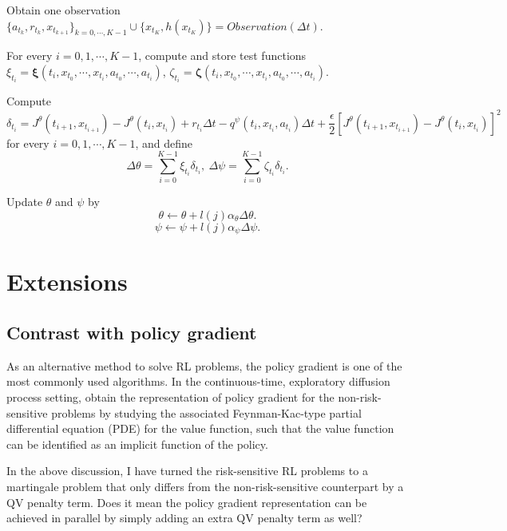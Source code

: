 \begin{algorithm}[htbp]
\begin{algorithmic}
{{				Obtain one observation $\{a_{t_k}, r_{t_{k}}, x_{t_{k+1}}\}_{k = 0,\cdots, K-1}\cup \{ x_{t_K}, h(x_{t_K})\} = \textit{Observation}(\Delta t)$.
				
			}
			
			
			For every $i = 0,1,\cdots,K-1$, compute and store test functions $\xi_{t_i} = \bm{\xi}(t_i, x_{t_0},\cdots, x_{t_i},a_{t_0},\cdots, a_{t_i})$, $\zeta_{t_i} = \bm{\zeta}(t_i, x_{t_0},\cdots, x_{t_i},a_{t_0},\cdots, a_{t_i})$.	
			
			Compute
			\[ \delta_{t_i} = J^{\theta}(t_{i+1},x_{t_{i+1}}) - J^{\theta}(t_{i},x_{t_{i}}) + r_{t_i}\Delta t -q^{\psi}(t_{i},x_{t_{i}},a_{t_i})\Delta t + \frac{\epsilon}{2}\left[ J^{\theta}(t_{i+1},x_{t_{i+1}}) - J^{\theta}(t_{i},x_{t_{i}})   \right]^2  \]
			for every $i = 0,1,\cdots,K-1$, and define
			\[ \Delta \theta = \sum_{i=0}^{K-1} \xi_{t_i} \delta_{t_i},\ \Delta \psi =   \sum_{i=0}^{K-1}\zeta_{t_i}\delta_{t_i} . \]
			
			
			Update $\theta$ and $\psi$ by
			\[ \theta \leftarrow \theta + l(j)\alpha_{\theta} \Delta \theta .\]
			\[ \psi \leftarrow \psi + l(j)\alpha_{\psi} \Delta \psi .  \]
			
		}
		\EndFor
	\end{algorithmic}
	\label{algo:offline episodic general}
\end{algorithm}

\section{Extensions}
\label{sec:extensions}

\subsection{Contrast with policy gradient}
As an alternative method to solve RL problems, the policy gradient is one of the most commonly used algorithms. In the continuous-time, exploratory diffusion process setting, \citet{jia2022policypg} obtain the representation of policy gradient for the non-risk-sensitive problems by studying the associated Feynman-Kac-type partial differential equation (PDE) for the value function, such that the value function can be identified as an implicit function of the policy. 

In the above discussion, I have turned the risk-sensitive RL problems to a martingale problem that only differs from the non-risk-sensitive counterpart by a QV penalty term. Does it mean the policy gradient representation can be achieved in parallel by simply adding an extra QV penalty term as well? 


